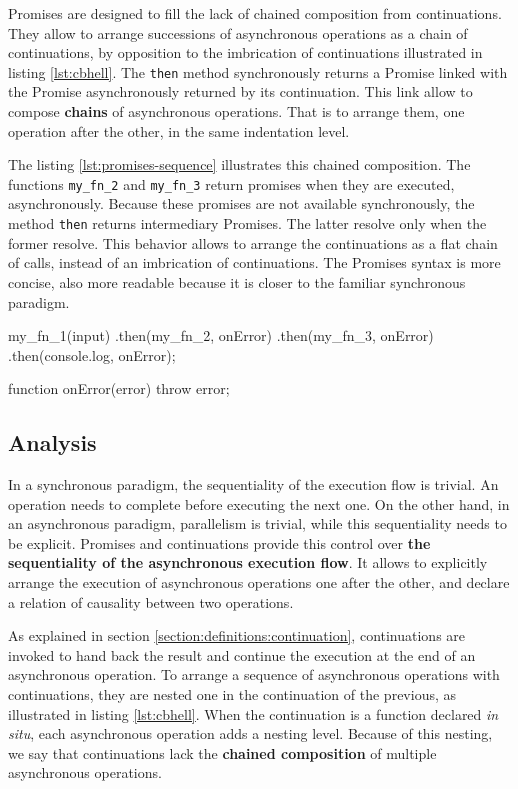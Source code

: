 Promises are designed to fill the lack of chained composition from continuations.
They allow to arrange successions of asynchronous operations as a chain of continuations, by opposition to the imbrication of continuations illustrated in listing \ref{lst:cbhell}.
The \texttt{then} method synchronously returns a Promise linked with the Promise asynchronously returned by its continuation.
This link allow to compose \textbf{chains} of asynchronous operations.
That is to arrange them, one operation after the other, in the same indentation level.

The listing \ref{lst:promises-sequence} illustrates this chained composition.
The functions \texttt{my_fn_2} and \texttt{my_fn_3} return promises when they are executed, asynchronously.
Because these promises are not available synchronously, the method \texttt{then} returns intermediary Promises.
The latter resolve only when the former resolve.
This behavior allows to arrange the continuations as a flat chain of calls, instead of an imbrication of continuations.
The Promises syntax is more concise, also more readable because it is closer to the familiar synchronous paradigm.

\begin{code}[js, %
             caption={The chain of Promises is more concise than an imbrication of callbacks}, %
             label={lst:promises-sequence}] %
my_fn_1(input)
.then(my_fn_2, onError)
.then(my_fn_3, onError)
.then(console.log, onError);

function onError(error) {
  throw error;
}
\end{code}

\subsection{Analysis} \label{seciton:definitions:analysis}

In a synchronous paradigm, the sequentiality of the execution flow is trivial.
An operation needs to complete before executing the next one.
On the other hand, in an asynchronous paradigm, parallelism is trivial, while this sequentiality needs to be explicit.
Promises and continuations provide this control over \textbf{the sequentiality of the asynchronous execution flow}.
It allows to explicitly arrange the execution of asynchronous operations one after the other, and declare a relation of causality between two operations.

As explained in section \ref{section:definitions:continuation}, continuations are invoked to hand back the result and continue the execution at the end of an asynchronous operation.
To arrange a sequence of asynchronous operations with continuations, they are nested one in the continuation of the previous, as illustrated in listing \ref{lst:cbhell}.
When the continuation is a function declared \textit{in situ}, each asynchronous operation adds a nesting level.
Because of this nesting, we say that continuations lack the \textbf{chained composition} of multiple asynchronous operations.

